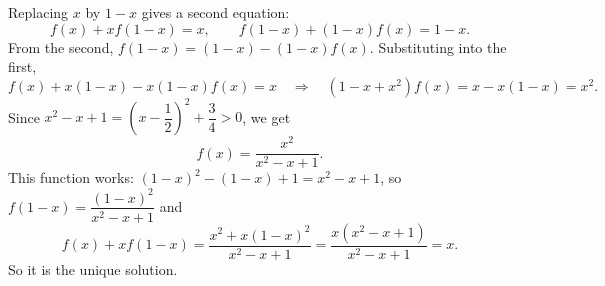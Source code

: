 Replacing $x$ by $1-x$ gives a second equation:
\[f(x)+xf(1-x)=x,\qquad f(1-x)+(1-x)f(x)=1-x.\]
From the second, $f(1-x)=(1-x)-(1-x)f(x)$. Substituting into the first,
\[f(x)+x(1-x)-x(1-x)f(x)=x\quad\Longrightarrow\quad\left(1-x+x^2\right)f(x)=x-x(1-x)=x^2.\]
Since $x^2-x+1=\left(x-\dfrac12\right)^2+\dfrac34>0$, we get
\[\boxed{f(x)=\dfrac{x^2}{x^2-x+1}}.\]
This function works: $(1-x)^2-(1-x)+1=x^2-x+1$, so $f(1-x)=\dfrac{(1-x)^2}{x^2-x+1}$ and
\[f(x)+xf(1-x)=\dfrac{x^2+x(1-x)^2}{x^2-x+1}=\dfrac{x\left(x^2-x+1\right)}{x^2-x+1}=x.\]
So it is the unique solution.
